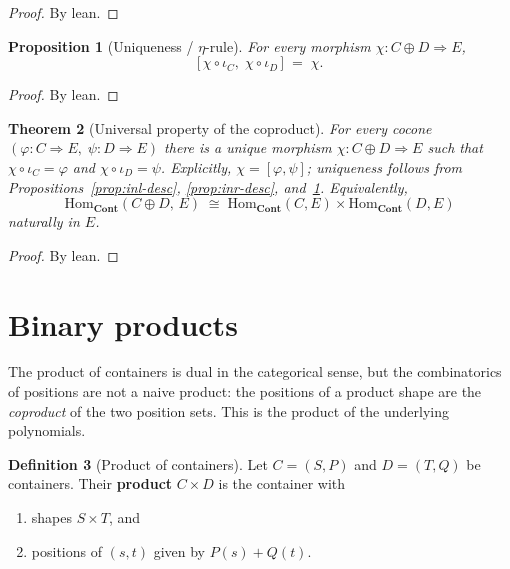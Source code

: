 \documentclass[11pt,a4paper]{article}
\theoremstyle{plain}
\newtheorem{theorem}{Theorem}[section]
\newtheorem{proposition}[theorem]{Proposition}
\theoremstyle{definition}
\newtheorem{definition}[theorem]{Definition}
\newcommand{\Cont}{\mathbf{Cont}}
\newcommand{\Hom}{\mathrm{Hom}}
\begin{document}
\begin{proof}
By lean.
\end{proof}

\begin{proposition}[Uniqueness / $\eta$-rule]\label{prop:desc-eta}
For every morphism $\chi:C\oplus D\Rightarrow E$,
\begin{equation}
  \bigl[\,\chi\circ\iota_C,\; \chi\circ\iota_D\,\bigr] \;=\; \chi.
\end{equation}
\end{proposition}

\begin{proof}
By lean.
\end{proof}

\begin{theorem}[Universal property of the coproduct]\label{thm:coprod-up}
For every cocone $(\varphi:C\Rightarrow E,\;\psi:D\Rightarrow E)$ there is a
unique morphism $\chi:C\oplus D\Rightarrow E$ such that
$\chi\circ\iota_C=\varphi$ and $\chi\circ\iota_D=\psi$. Explicitly,
$\chi=[\varphi,\psi]$; uniqueness follows from Propositions~\ref{prop:inl-desc},
\ref{prop:inr-desc}, and~\ref{prop:desc-eta}. Equivalently,
\begin{equation}
  \Hom_{\Cont}(C\oplus D,\,E)
  \;\cong\;
  \Hom_{\Cont}(C,E)\times\Hom_{\Cont}(D,E)
\end{equation}
naturally in $E$.
\end{theorem}

\begin{proof}
By lean.
\end{proof}

\section{Binary products}

The product of containers is dual in the categorical sense, but the
combinatorics of positions are not a naive product: the positions of a
product shape are the \emph{coproduct} of the two position sets. This is the
product of the underlying polynomials.

\begin{definition}[Product of containers]\label{def:prod}
Let $C=(S,P)$ and $D=(T,Q)$ be containers. Their \textbf{product}
$C\times D$ is the container with
\begin{enumerate}
  \item shapes $S\times T$, and
  \item positions of $(s,t)$ given by $P(s)+Q(t)$.
\end{enumerate}
\end{definition}
\end{document}

